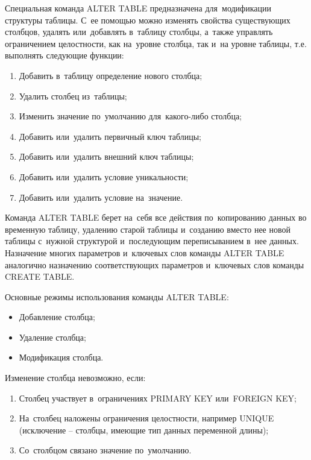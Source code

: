 \documentclass{ou}
\begin{document}
Специальная команда ALTER TABLE предназначена для~модификации структуры таблицы. С~ее помощью можно изменять свойства существующих столбцов, удалять или~добавлять в~таблицу столбцы, а~также управлять ограничением целостности, как на~уровне столбца, так и~на уровне таблицы, т.е. выполнять следующие функции: 
\begin{enumerate}[leftmargin=0em, itemindent=3.75em, nosep, label=\arabic*)]
\item Добавить в~таблицу определение нового столбца;
\item Удалить столбец из~таблицы;
\item Изменить значение по~умолчанию для~какого-либо столбца;
\item Добавить или~удалить первичный ключ таблицы;
\item Добавить или~удалить внешний ключ таблицы;
\item Добавить или~удалить условие уникальности;
\item Добавить или~удалить условие на~значение.
\end{enumerate}
 
Команда ALTER TABLE берет на~себя все действия по~копированию данных во временную таблицу, удалению старой таблицы и~созданию вместо нее новой таблицы с~нужной структурой и~последующим переписыванием в~нее данных. Назначение многих параметров и~ключевых слов команды ALTER TABLE аналогично назначению соответствующих параметров и~ключевых слов команды CREATE TABLE. 

Основные режимы использования команды ALTER TABLE: 
\begin{itemize}[label=-, leftmargin=0em, itemindent=3.35em, nosep]
\item Добавление столбца;
\item Удаление столбца;
\item Модификация столбца.
\end{itemize}

Изменение столбца невозможно, если: 

\begin{enumerate}[leftmargin=0em, itemindent=3.75em, nosep, label=\arabic*)]
\item Столбец участвует в~ограничениях PRIMARY KEY или~FOREIGN KEY;
\item На~столбец наложены ограничения целостности, например UNIQUE (исключение -- столбцы, имеющие тип данных переменной длины);
\item Со~столбцом связано значение по~умолчанию.
\end{enumerate}
\end{document}
